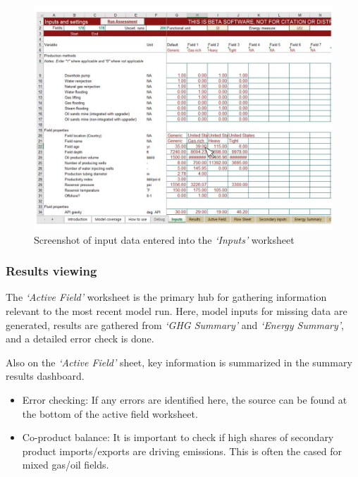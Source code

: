\documentclass[11pt]{report}
\newcommand{\sheet}[1]{\textit{`{#1}'}}
\begin{document}
\begin{figure}[h]
\includegraphics[width=1\columnwidth]{documentation/images/User_Guide_figs/inputs.jpg}
\caption{Screenshot of input data entered into the \sheet{Inputs} worksheet}
\label{fig:example_inputs}
\end{figure}

\subsubsection{Results viewing}

The \sheet{Active Field} worksheet is the primary hub for gathering information relevant to the most recent model run. Here, model inputs for missing data are generated, results are gathered from \sheet{GHG Summary} and \sheet{Energy Summary}, and a detailed error check is done.

Also on the \sheet{Active Field} sheet, key information is summarized in the summary results dashboard. 

\begin{itemize}
\item Error checking: If any errors are identified here, the source can be found at the bottom of the active field worksheet.
\item Co-product balance: It is important to check if high shares of secondary product imports/exports are driving emissions. This is often the cased for mixed gas/oil fields.
\end{itemize}
\end{document}

